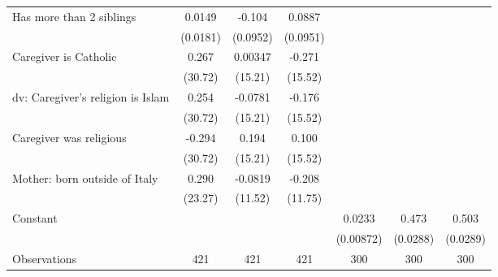 {\begin{tabular}{l*{6}{c}}
\addlinespace
Has more than 2 siblings&      0.0149         &      -0.104         &      0.0887         &                     &                     &                     \\
                    &    (0.0181)         &    (0.0952)         &    (0.0951)         &                     &                     &                     \\
\addlinespace
Caregiver is Catholic&       0.267         &     0.00347         &      -0.271         &                     &                     &                     \\
                    &     (30.72)         &     (15.21)         &     (15.52)         &                     &                     &                     \\
\addlinespace
dv: Caregiver's religion is Islam&       0.254         &     -0.0781         &      -0.176         &                     &                     &                     \\
                    &     (30.72)         &     (15.21)         &     (15.52)         &                     &                     &                     \\
\addlinespace
Caregiver was religious&      -0.294         &       0.194         &       0.100         &                     &                     &                     \\
                    &     (30.72)         &     (15.21)         &     (15.52)         &                     &                     &                     \\
\addlinespace
Mother: born outside of Italy&       0.290         &     -0.0819         &      -0.208         &                     &                     &                     \\
                    &     (23.27)         &     (11.52)         &     (11.75)         &                     &                     &                     \\
\addlinespace
Constant            &                     &                     &                     &      0.0233\sym{**} &       0.473\sym{***}&       0.503\sym{***}\\
                    &                     &                     &                     &   (0.00872)         &    (0.0288)         &    (0.0289)         \\
\midrule
Observations        &         421         &         421         &         421         &         300         &         300         &         300         \\
\bottomrule
\end{tabular}
}
